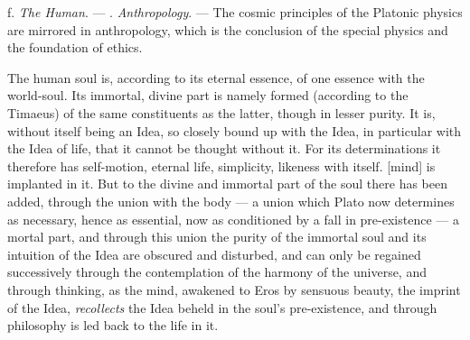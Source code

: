 \divrule

f. \emph{The Human}. --- . \emph{Anthropology}. ---
The cosmic principles of the Platonic physics are mirrored in anthropology, which is the conclusion of the special physics and the foundation of ethics.

The human soul is, according to its eternal essence, of one essence with
the world-soul. Its immortal, divine part is namely formed
(according to the Timaeus) of the same constituents as the latter,
though in lesser purity. It is, without itself being an Idea,
so closely bound up with the Idea, in particular with the Idea of life,
that it cannot be thought without it. For its determinations it
therefore has self-motion, eternal life, simplicity, likeness with
itself.  [mind] is implanted in it. But to the divine and immortal part of the soul there has been added, through the union with
the body --- a union which Plato now determines as necessary, hence as essential, now as conditioned by a fall
in pre-existence --- a mortal part, and through this
union the purity of the immortal soul and its intuition of
the Idea are obscured and disturbed, and can only be regained successively through the contemplation of the harmony of the universe, and through thinking, as the mind, awakened to Eros by sensuous beauty, the imprint of the Idea, \emph{recollects} the Idea beheld in the soul's pre-existence, and through philosophy is led back to
the life in it.

